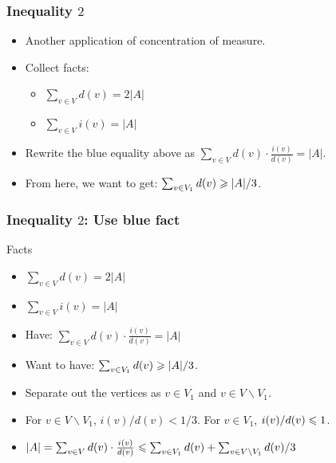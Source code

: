 \documentclass{beamer}
\begin{document}
\begin{frame}
\frametitle{Inequality $2$}
\begin{itemize}
\item Another application of concentration of measure.
\item Collect facts:
\begin{itemize}
\item {\color{red} $\sum_{v\in V} d(v) = 2|A|$}
\item {\color{blue} $\sum_{v \in V} i(v) = |A|$}
\end{itemize}
\item Rewrite the {\color{blue} blue} equality above as {\color{blue} $\sum_{v \in V} d(v)\cdot\frac{i(v)}{d(v)} = |A|$}. 
\item From here, we want to get: $\sum_{v\in V_1} d(v) \geqslant |A|/3$.
\end{itemize}
\end{frame}

\begin{frame}
\frametitle{Inequality $2$: Use {\color{blue} blue} fact}
\begin{block}{Facts}
\begin{itemize}
\item {\color{red} $\sum_{v\in V} d(v) = 2|A|$}
\item {\color{blue} $\sum_{v \in V} i(v) = |A|$}
\end{itemize}
\end{block}
\begin{itemize}
\item Have: {\color{blue} $\sum_{v \in V} d(v)\cdot\frac{i(v)}{d(v)} 
= |A|$}
\item Want to have: $\sum_{v\in V_1} d(v) \geqslant |A|/3$.
\pause
\item Separate out the vertices as $v\in V_1$ and $v\in V\backslash V_1$. 
\pause
\item For $v \in V \backslash V_1$, $i(v)/d(v) < 1/3$. For $v \in V_1$, $i(v)/d(v) \leqslant 1$. 
\item {\color{blue} $|A| = \sum_{v \in V} d(v)\cdot\frac{i(v)}{d(v)} \leqslant \sum_{v \in V_1} d(v) + \sum_{v\in V\backslash V_1} d(v)/3$}
\end{itemize}
\end{frame}
\end{document}
